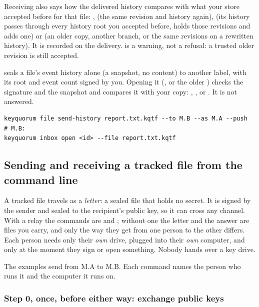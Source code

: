 Receiving also says how the delivered history compares with what
your store accepted before for that file: ,  (the
same revision and history again),  (its history passes through
every history root you accepted before, holds those revisions and adds one)
or  (an older copy, another branch, or the same revisions on
a rewritten history). It is recorded on the delivery.  is a
warning, not a refusal: a trusted older revision is still accepted.

 seals a file's event history alone (a 
snapshot, no content) to another label, with its root and event count signed
by you. Opening it (, or the older
) checks the signature and the snapshot and
compares it with your copy: , ,
 or . It is not answered.

\begin{lstlisting}
keyquorum file send-history report.txt.kqtf --to M.B --as M.A --push
# M.B:
keyquorum inbox open <id> --file report.txt.kqtf
\end{lstlisting}

\subsection{Sending and receiving a tracked file from the command line}

A tracked file travels as a \emph{letter}: a sealed  file that
holds no secret. It is signed by the sender and sealed to the recipient's
public key, so it can cross any channel. With a relay the commands are
 and ; without one the letter and the answer are
files you carry, and only the way they get from one person to the other
differs. Each person needs only their \emph{own} drive, plugged into their \emph{own} computer,
and only at the moment they sign or open something. Nobody hands over a
key drive.

The examples send  from M.A to M.B. Each command names
the person who runs it and the computer it runs on.

\subsubsection*{Step 0, once, before either way: exchange public keys}

